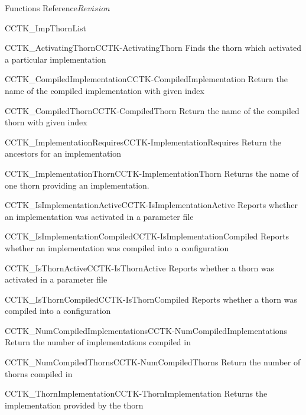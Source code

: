 \begin{cactuspart}{ Functions Reference}{}{$Revision$}
\begin{FunctionDescription}{CCTK\_ImpThornList}
\begin{SeeAlsoSection}
\begin{SeeAlso2}{CCTK\_ActivatingThorn}{CCTK-ActivatingThorn}
  Finds the thorn which activated a particular implementation
\end{SeeAlso2}
\begin{SeeAlso2}{CCTK\_CompiledImplementation}{CCTK-CompiledImplementation}
  Return the name of the compiled implementation with given index
\end{SeeAlso2}
\begin{SeeAlso2}{CCTK\_CompiledThorn}{CCTK-CompiledThorn}
  Return the name of the compiled thorn with given index
\end{SeeAlso2}
\begin{SeeAlso2}{CCTK\_ImplementationRequires}{CCTK-ImplementationRequires}
  Return the ancestors for an implementation
\end{SeeAlso2}
\begin{SeeAlso2}{CCTK\_ImplementationThorn}{CCTK-ImplementationThorn}
  Returns the name of one thorn providing an implementation.
\end{SeeAlso2}
\begin{SeeAlso2}{CCTK\_IsImplementationActive}{CCTK-IsImplementationActive}
  Reports whether an implementation was activated in a parameter file
\end{SeeAlso2}
\begin{SeeAlso2}{CCTK\_IsImplementationCompiled}{CCTK-IsImplementationCompiled}
  Reports whether an implementation was compiled into a configuration
\end{SeeAlso2}
\begin{SeeAlso2}{CCTK\_IsThornActive}{CCTK-IsThornActive}
  Reports whether a thorn was activated in a parameter file
\end{SeeAlso2}
\begin{SeeAlso2}{CCTK\_IsThornCompiled}{CCTK-IsThornCompiled}
  Reports whether a thorn was compiled into a configuration
\end{SeeAlso2}
\begin{SeeAlso2}{CCTK\_NumCompiledImplementations}{CCTK-NumCompiledImplementations}
  Return the number of implementations compiled in
\end{SeeAlso2}
\begin{SeeAlso2}{CCTK\_NumCompiledThorns}{CCTK-NumCompiledThorns}
  Return the number of thorns compiled in
\end{SeeAlso2}
\begin{SeeAlso2}{CCTK\_ThornImplementation}{CCTK-ThornImplementation}
  Returns the implementation provided by the thorn
\end{SeeAlso2}
\end{SeeAlsoSection}


\end{FunctionDescription}
\end{cactuspart}
